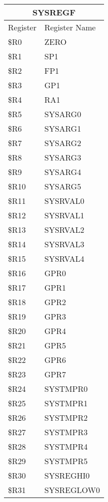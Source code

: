 \documentclass[letterpaper, 11pt]{article}
\begin{document}
\begin{figure}[!h]
{	}
	\hfill
	\parbox{0.5\linewidth}{
		\centering
		\fontsize{10}{12}\selectfont
		\begin{tabular}{|l|l|}
			\hline
			\multicolumn{2}{|c|}{SYSREGF} \\
			\hline
			Register & Register Name \\ \hline
			\$R0  & ZERO \\ 	\hline
			\$R1  & SP1 \\ 	\hline
			\$R2  & FP1 \\ 	\hline
			\$R3  & GP1 \\ 	\hline
			\$R4  & RA1 \\ 	\hline
			\$R5  & SYSARG0 \\ 	\hline
			\$R6  & SYSARG1 \\ 	\hline
			\$R7  & SYSARG2 \\ 	\hline
			\$R8  & SYSARG3 \\ 	\hline
			\$R9  & SYSARG4 \\ 	\hline
			\$R10 & SYSARG5 \\ \hline
			\$R11 & SYSRVAL0  \\ \hline
			\$R12 & SYSRVAL1  \\ \hline
			\$R13 & SYSRVAL2  \\ \hline
			\$R14 & SYSRVAL3  \\ \hline
			\$R15 & SYSRVAL4  \\ \hline
			\$R16 & GPR0  \\ \hline
			\$R17 & GPR1  \\ \hline
			\$R18 & GPR2  \\ \hline
			\$R19 & GPR3  \\ \hline
			\$R20 & GPR4  \\ \hline
			\$R21 & GPR5  \\ \hline
			\$R22 & GPR6  \\ \hline
			\$R23 & GPR7  \\ \hline
			\$R24 & SYSTMPR0  \\ \hline
			\$R25 & SYSTMPR1  \\ \hline
			\$R26 & SYSTMPR2  \\ \hline
			\$R27 & SYSTMPR3  \\ \hline
			\$R28 & SYSTMPR4  \\ \hline
			\$R29 & SYSTMPR5  \\ \hline
			\$R30 & SYSREGHI0  \\ \hline
			\$R31 & SYSREGLOW0  \\ \hline
		\end{tabular}
	}
\end{figure}
\end{document}
